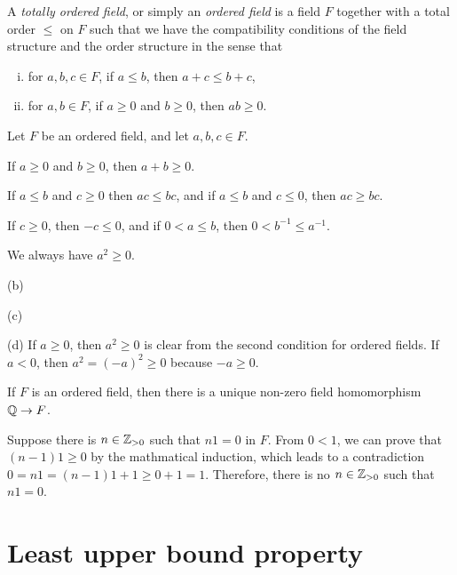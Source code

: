 \documentclass{../../large}
\begin{document}
\begin{prb}
A \emph{totally ordered field}, or simply an \emph{ordered field} is a field $F$ together with a total order $\le$ on $F$ such that we have the compatibility conditions of the field structure and the order structure in the sense that
\begin{enumerate}[(i)]
\item for $a,b,c\in F$, if $a\le b$, then $a+c\le b+c$,
\item for $a,b\in F$, if $a\ge0$ and $b\ge0$, then $ab\ge0$.
\end{enumerate}
Let $F$ be an ordered field, and let $a,b,c\in F$.
\begin{parts}
\item If $a\ge0$ and $b\ge0$, then $a+b\ge0$.
\item If $a\le b$ and $c\ge0$ then $ac\le bc$, and if $a\le b$ and $c\le0$, then $ac\ge bc$.
\item If $c\ge0$, then $-c\le0$, and if $0<a\le b$, then $0<b^{-1}\le a^{-1}$.
\item We always have $a^2\ge0$.
\end{parts}
\end{prb}
\begin{pf}
(b)

(c)

(d)
If $a\ge0$, then $a^2\ge0$ is clear from the second condition for ordered fields.
If $a<0$, then $a^2=(-a)^2\ge0$ because $-a\ge0$.


\end{pf}


\begin{prb}
If $F$ is an ordered field, then there is a unique non-zero field homomorphism $\mathbb{Q}\to F$.
\end{prb}

\begin{pf}


Suppose there is $n\in\mathbb{Z}_{>0}$ such that $n1=0$ in $F$.
From $0<1$, we can prove that $(n-1)1\ge0$ by the mathmatical induction, which leads to a contradiction $0=n1=(n-1)1+1\ge0+1=1$.
Therefore, there is no $n\in\mathbb{Z}_{>0}$ such that $n1=0$.
\end{pf}




\section{Least upper bound property}
\end{document}
